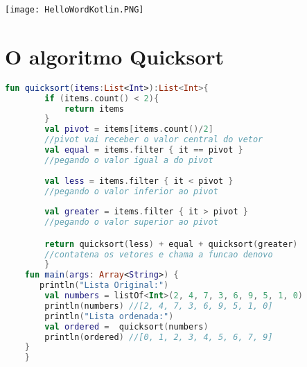 \texttt{[image: HelloWordKotlin.PNG]}


\section{O algoritmo Quicksort}
\begin{lstlisting}[label={lst:example1}, language=Kotlin]
      fun quicksort(items:List<Int>):List<Int>{
        if (items.count() < 2){
            return items
        }
        val pivot = items[items.count()/2]
        //pivot vai receber o valor central do vetor
        val equal = items.filter { it == pivot }
        //pegando o valor igual a do pivot
    
        val less = items.filter { it < pivot }
        //pegando o valor inferior ao pivot
    
        val greater = items.filter { it > pivot }
        //pegando o valor superior ao pivot

        return quicksort(less) + equal + quicksort(greater)
        //contatena os vetores e chama a funcao denovo
        }
    fun main(args: Array<String>) {
       println("Lista Original:")
        val numbers = listOf<Int>(2, 4, 7, 3, 6, 9, 5, 1, 0)
        println(numbers) //[2, 4, 7, 3, 6, 9, 5, 1, 0]
        println("Lista ordenada:")
        val ordered =  quicksort(numbers)
        println(ordered) //[0, 1, 2, 3, 4, 5, 6, 7, 9]
    }
    }   \end{lstlisting}

